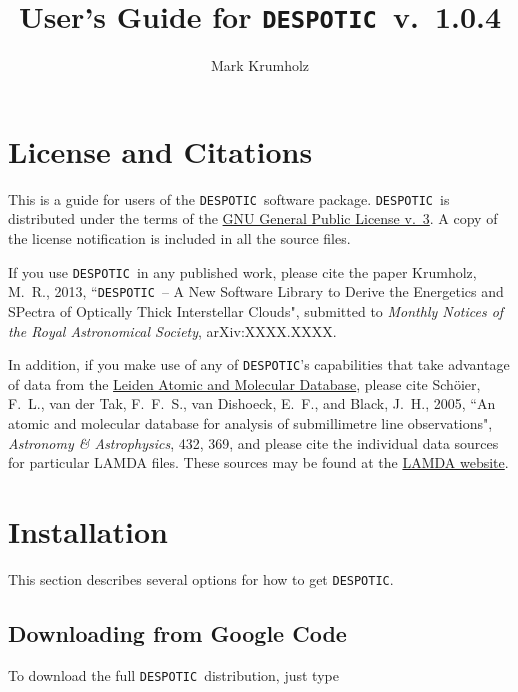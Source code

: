 \documentclass[12pt]{article}
\newcommand{\despotic}{\texttt{DESPOTIC}}
\begin{document}
\title{User's Guide for \despotic\ v.~1.0.4}
\author{Mark Krumholz}

\maketitle

\tableofcontents

\clearpage

\section{License and Citations}

This is a guide for users of the \despotic\ software package. \despotic\ is distributed under the terms of the \href{http://http://www.gnu.org/licenses/gpl.html}{GNU General Public License v.~3}. A copy of the license notification is included in all the source files.

If you use \despotic\ in any published work, please cite the paper Krumholz, M.~R., 2013, ``\despotic\ -- A New Software Library to Derive the Energetics and SPectra of Optically Thick Interstellar Clouds", submitted to \textit{Monthly Notices of the Royal Astronomical Society}, arXiv:XXXX.XXXX.

In addition, if you make use of any of \despotic's capabilities that take advantage of data from the \href{http://home.strw.leidenuniv.nl/~moldata/}{Leiden Atomic and Molecular Database}, please cite Sch\"oier, F.~L., van der Tak, F.~F.~S., van Dishoeck, E.~F., and Black, J.~H., 2005, ``An atomic and molecular database for analysis of submillimetre line observations", \textit{Astronomy \& Astrophysics}, 432, 369, and please cite the individual data sources for particular LAMDA files. These sources may be found at the \href{http://home.strw.leidenuniv.nl/~moldata/}{LAMDA website}.

\clearpage


\section{Installation}

This section describes several options for how to get \despotic.

\subsection{Downloading from Google Code}

To download the full \despotic\ distribution, just type
\end{document}
